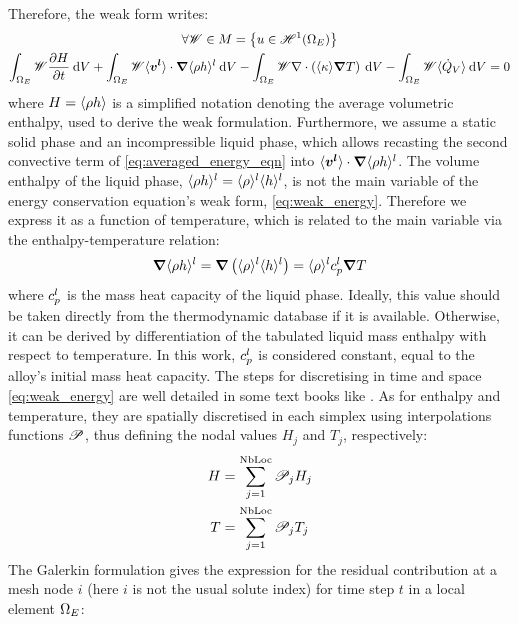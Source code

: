 Therefore, the weak form writes:
\begin{multline}
\label{eq:weak_energy}
\forall \mathscr{W} \in M=\left\{ u \in \mathscr{H}^1(\Omega_E) \right\} \\
\int_{\Omega_E} \mathscr{W} \frac{\partial H}{\partial t} \: \mathrm{d}V 
 + \int_{\Omega_E} \mathscr{W} \langle \boldsymbol{v^l} \rangle \cdot \boldsymbol{\nabla} \langle \rho h \rangle^l\: \mathrm{d}V
 - \int_{\Omega_E} \mathscr{W} \nabla \cdot \left(  \langle \kappa \rangle \boldsymbol{\nabla} T \right) \: \mathrm{d}V
 - \int_{\Omega_E} \mathscr{W} \langle \dot{Q}_{{V}} \rangle \: \mathrm{d}V
 = 0
\end{multline}
where $H=\langle \rho h \rangle$ is a simplified notation denoting the average volumetric enthalpy, used to derive the weak formulation. 
Furthermore, we assume a static solid phase and an incompressible liquid phase, which allows recasting the second convective term of 
\cref{eq:averaged_energy_eqn} into $\langle \boldsymbol{v^l} \rangle \cdot \boldsymbol{\nabla} \langle \rho h \rangle^l$. 
The volume enthalpy of the liquid phase, $\langle \rho h \rangle^l = \langle \rho \rangle^l \langle h \rangle^l$, is not the main variable of the energy conservation equation's weak form, \cref{eq:weak_energy}.
Therefore we express it as a function of temperature, which is related to the main variable
via the enthalpy-temperature relation: 
\begin{align}
\label{eq:enthalpy_advection}
\boldsymbol{\nabla} \langle \rho h \rangle^l = \boldsymbol{\nabla} \left( \langle \rho \rangle^l \langle h \rangle^l \right) = \langle \rho \rangle^l c_p^l \boldsymbol{\nabla} T
\end{align}
where $c_p^l$ is the mass heat capacity of the liquid phase. Ideally, this value should
be taken directly from the thermodynamic database if it is available. Otherwise, it can be derived by differentiation 
of the tabulated liquid mass enthalpy with respect to temperature. In this work, $c_p^l$ is considered constant, 
equal to the alloy's initial mass heat capacity.  
The steps for discretising in time and space \cref{eq:weak_energy} are well detailed in  
some text books like \citet{rappaz_numerical_2003}. 
As for enthalpy and temperature, they are spatially discretised in each simplex 
using interpolations functions $\mathscr{P}$, thus defining the nodal values $H_j$ and $T_j$, respectively: 
\begin{align}
\label{eq:discretise_H}
H 	&= \sum_{j=1}^{\text{NbLoc}}  \mathscr{P}_j   H_j \\ 
\label{eq:discretise_T}
T		&= \sum_{j=1}^{\text{NbLoc}}  \mathscr{P}_j   T_j
\end{align}
The Galerkin formulation gives the expression for the residual contribution at a mesh node $i$ (here $i$ is not the usual solute index)
for time step $t$ in a local element $\Omega_E$:
